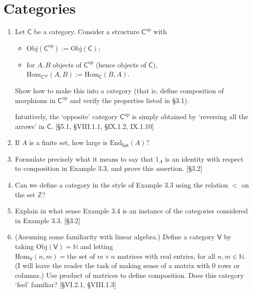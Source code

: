 \section{Categories}
\begin{enumerate}
    \item Let $\mathsf{C}$ be a category. Consider a structure $\mathsf{C}^{\mathrm{op}}$ with
          \begin{itemize}
              \item $\mathrm{Obj}(\mathsf{C}^{\mathrm{op}}) := \mathrm{Obj}(\mathsf{C})$;
              \item for $A, B$ objects of $\mathsf{C}^{\mathrm{op}}$ (hence objects of $\mathsf{C}$), $\mathrm{Hom}_{\mathsf{C}^{\mathrm{op}}}(A, B) := \mathrm{Hom}_{\mathsf{C}}(B, A)$.
          \end{itemize}
          Show how to make this into a category (that is, define composition of morphisms in $\mathsf{C}^{\mathrm{op}}$ and verify the properties listed in \S3.1).

          Intuitively, the `opposite' category $\mathsf{C}^{\mathrm{op}}$ is simply obtained by `reversing all the arrows' in $\mathsf{C}$. [\S5.1, \S VIII.1.1, \S IX.1.2, IX.1.10]

    \item If $A$ is a finite set, how large is $\mathrm{End}_{\mathsf{Set}}(A)$?

    \item Formulate precisely what it means to say that $1_A$ is an identity with respect to composition in Example 3.3, and prove this assertion. [\S3.2]

    \item Can we define a category in the style of Example 3.3 using the relation $<$ on the set $\mathbb{Z}$?

    \item Explain in what sense Example 3.4 is an instance of the categories considered in Example 3.3. [\S3.2]

    \item (Assuming some familiarity with linear algebra.) Define a category $\mathsf{V}$ by taking $\mathrm{Obj}(\mathsf{V}) = \mathbb{N}$ and letting $\mathrm{Hom}_{\mathsf{V}}(n, m) = \text{the set of } m \times n \text{ matrices with real entries}$, for all $n, m \in \mathbb{N}$. (I will leave the reader the task of making sense of a matrix with 0 rows or columns.) Use product of matrices to define composition. Does this category `feel' familiar? [\S VI.2.1, \S VIII.1.3]


\end{enumerate}
